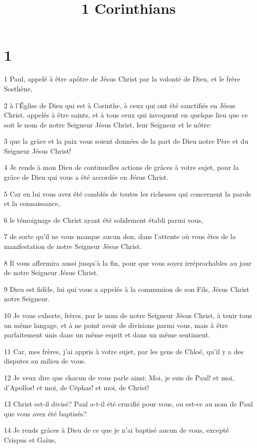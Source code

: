 

\title{1 Corinthians}


\chapter{1}

\par 1 Paul, appelé à être apôtre de Jésus Christ par la volonté de Dieu, et le frère Sosthène,
\par 2 à l'Église de Dieu qui est à Corinthe, à ceux qui ont été sanctifiés en Jésus Christ, appelés à être saints, et à tous ceux qui invoquent en quelque lieu que ce soit le nom de notre Seigneur Jésus Christ, leur Seigneur et le nôtre:
\par 3 que la grâce et la paix vous soient données de la part de Dieu notre Père et du Seigneur Jésus Christ!
\par 4 Je rends à mon Dieu de continuelles actions de grâces à votre sujet, pour la grâce de Dieu qui vous a été accordée en Jésus Christ.
\par 5 Car en lui vous avez été comblés de toutes les richesses qui concernent la parole et la connaissance,
\par 6 le témoignage de Christ ayant été solidement établi parmi vous,
\par 7 de sorte qu'il ne vous manque aucun don, dans l'attente où vous êtes de la manifestation de notre Seigneur Jésus Christ.
\par 8 Il vous affermira aussi jusqu'à la fin, pour que vous soyez irréprochables au jour de notre Seigneur Jésus Christ.
\par 9 Dieu est fidèle, lui qui vous a appelés à la communion de son Fils, Jésus Christ notre Seigneur.
\par 10 Je vous exhorte, frères, par le nom de notre Seigneur Jésus Christ, à tenir tous un même langage, et à ne point avoir de divisions parmi vous, mais à être parfaitement unis dans un même esprit et dans un même sentiment.
\par 11 Car, mes frères, j'ai appris à votre sujet, par les gens de Chloé, qu'il y a des disputes au milieu de vous.
\par 12 Je veux dire que chacun de vous parle ainsi: Moi, je suis de Paul! et moi, d'Apollos! et moi, de Céphas! et moi, de Christ!
\par 13 Christ est-il divisé? Paul a-t-il été crucifié pour vous, ou est-ce au nom de Paul que vous avez été baptisés?
\par 14 Je rends grâces à Dieu de ce que je n'ai baptisé aucun de vous, excepté Crispus et Gaïus,
